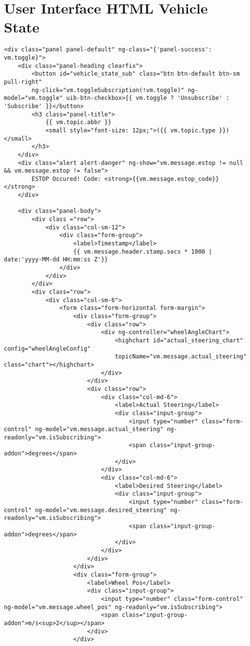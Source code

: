 \section{User Interface HTML Vehicle State}
\begin{verbatim}
<div class="panel panel-default" ng-class="{'panel-success': vm.toggle}">
    <div class="panel-heading clearfix">
        <button id="vehicle_state_sub" class="btn btn-default btn-sm pull-right" 
        ng-click="vm.toggleSubscription(!vm.toggle)" ng-model="vm.toggle" uib-btn-checkbox>{{ vm.toggle ? 'Unsubscribe' : 'Subscribe' }}</button>
        <h3 class="panel-title">
            {{ vm.topic.abbr }}
            <small style="font-size: 12px;">({{ vm.topic.type }})</small>
        </h3>
    </div>
    <div class="alert alert-danger" ng-show="vm.message.estop != null && vm.message.estop != false">
        ESTOP Occured! Code: <strong>{{vm.message.estop_code}}</strong>
    </div>

    <div class="panel-body">
        <div class ="row">
            <div class="col-sm-12">
                <div class="form-group">
                    <label>Timestamp</label>
                    {{ vm.message.header.stamp.secs * 1000 | date:'yyyy-MM-dd HH:mm:ss Z'}}
                </div>
            </div>
        </div>
        <div class="row">
            <div class="col-sm-6">
                <form class="form-horizontal form-margin">
                    <div class="form-group">
                        <div class="row">
                            <div ng-controller="wheelAngleChart">
                                <highchart id="actual_steering_chart" config="wheelAngleConfig" 
                                topicName="vm.message.actual_steering" class="chart"></highchart>
                            </div>
                        </div>
                        <div class="row">
                            <div class="col-md-6">
                                <label>Actual Steering</label>
                                <div class="input-group">
                                    <input type="number" class="form-control" ng-model="vm.message.actual_steering" ng-readonly="vm.isSubscribing">
                                    <span class="input-group-addon">degrees</span>
                                </div>
                            </div>
                            <div class="col-md-6">
                                <label>Desired Steering</label>
                                <div class="input-group">
                                    <input type="number" class="form-control" ng-model="vm.message.desired_steering" ng-readonly="vm.isSubscribing">
                                    <span class="input-group-addon">degrees</span>
                                </div>
                            </div>
                        </div>
                    </div>
                    <div class="form-group">
                        <label>Wheel Pos</label>
                        <div class="input-group">
                            <input type="number" class="form-control" ng-model="vm.message.wheel_pos" ng-readonly="vm.isSubscribing">
                            <span class="input-group-addon">m/s<sup>2</sup></span>
                        </div>
                    </div>


\end{verbatim}
